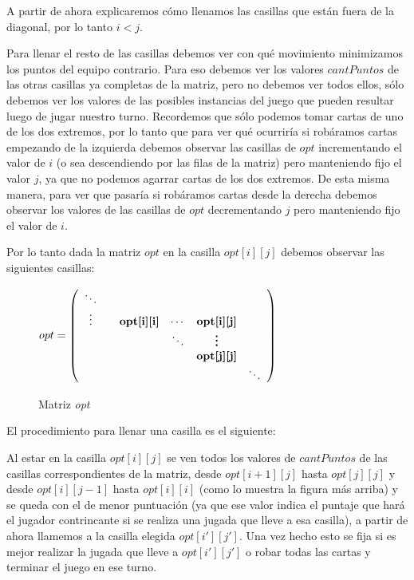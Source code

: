 A partir de ahora explicaremos cómo llenamos las casillas que están fuera de la diagonal, por lo tanto $i < j$.

Para llenar el resto de las casillas debemos ver con qué movimiento minimizamos los puntos del equipo contrario. Para eso debemos ver los valores $cantPuntos$ de las otras casillas ya completas de la matriz, pero no debemos ver todos ellos, sólo debemos ver los valores de las posibles instancias del juego que pueden resultar luego de jugar nuestro turno. Recordemos que sólo podemos tomar cartas de uno de los dos extremos, por lo tanto que para ver qué ocurriría si robáramos cartas empezando de la izquierda debemos observar las casillas de $opt$ incrementando el valor de $i$ (o sea descendiendo por las filas de la matriz) pero manteniendo fijo el valor $j$, ya que no podemos agarrar cartas de los dos extremos. De esta misma manera, para ver que pasaría si robáramos cartas desde la derecha debemos observar los valores de las casillas de $opt$ decrementando $j$ pero manteniendo fijo el valor de $i$.

Por lo tanto dada la matriz $opt$ en la casilla $opt[i][j]$ debemos observar las siguientes casillas:

\begin{figure}[H]
\begin{center}
$opt= \left(
\begin{array}{cccccc}
 \ddots & & & & \\ 
 \vdots & & \textbf{opt[i][i]} & \cdots & \textbf{opt[i][j]} \\
 & & & \ddots & \textbf{\vdots} & \\
 & & & & \textbf{opt[j][j]} &\\
 & & & & & \ddots \\
 
\end{array}
\right)$
\caption{Matriz \emph{opt}}
\end{center}
\end{figure}

El procedimiento para llenar una casilla es el siguiente:

Al estar en la casilla $opt[i][j]$ se ven todos los valores de $cantPuntos$ de las casillas correspondientes de la matriz, desde $opt[i+1][j]$ hasta $opt[j][j]$ y desde $opt[i][j-1]$ hasta $opt[i][i]$ (como lo muestra la figura más arriba) y se queda con el de menor puntuación (ya que ese valor indica el puntaje que hará el jugador contrincante si se realiza una jugada que lleve a esa casilla), a partir de ahora llamemos a la casilla elegida $opt[i'][j']$. Una vez hecho esto se fija si es mejor realizar la jugada que lleve a $opt[i'][j']$ o robar todas las cartas y terminar el juego en ese turno. 


